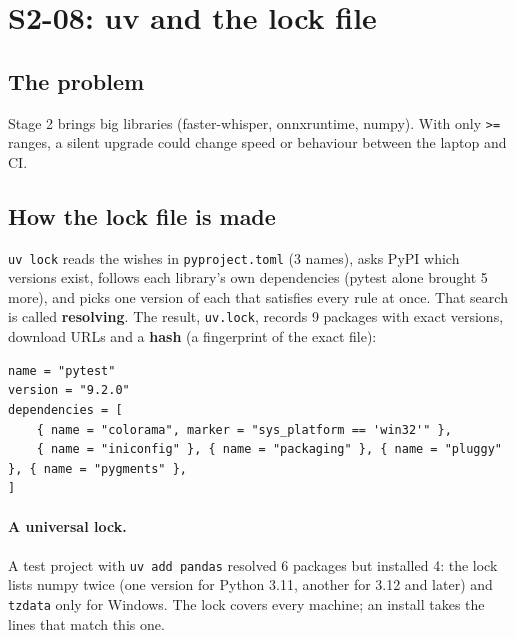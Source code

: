 \documentclass[11pt,a4paper]{article}
\begin{document}
\section{S2-08: uv and the lock file}\label{sec:uv}
\subsection{The problem}
Stage 2 brings big libraries (faster-whisper, onnxruntime, numpy). With only \texttt{>=} ranges,
a silent upgrade could change speed or behaviour between the laptop and CI.

\subsection{How the lock file is made}
\texttt{uv lock} reads the wishes in \texttt{pyproject.toml} (3 names), asks PyPI which versions
exist, follows each library's own dependencies (pytest alone brought 5 more), and picks one
version of each that satisfies every rule at once. That search is called \textbf{resolving}.
The result, \texttt{uv.lock}, records 9 packages with exact versions, download URLs and a
\textbf{hash} (a fingerprint of the exact file):
\begin{lstlisting}
name = "pytest"
version = "9.2.0"
dependencies = [
    { name = "colorama", marker = "sys_platform == 'win32'" },
    { name = "iniconfig" }, { name = "packaging" }, { name = "pluggy" }, { name = "pygments" },
]
\end{lstlisting}

\paragraph{A universal lock.} A test project with \texttt{uv add pandas} resolved 6 packages
but installed 4: the lock lists numpy twice (one version for Python 3.11, another for 3.12 and
later) and \texttt{tzdata} only for Windows. The lock covers every machine; an install takes the
lines that match this one.
\end{document}
